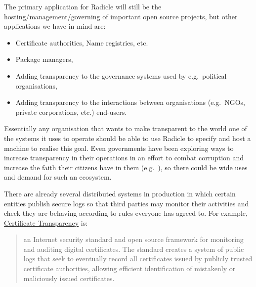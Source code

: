\documentclass[a4paper, oneside, 10pt]{amsart}
\begin{document}
The primary application for Radicle will still be the
hosting/management/governing of important open source projects, but other
applications we have in mind are:
\begin{itemize}
\item
  Certificate authorities, Name registries, etc.
\item
  Package managers,
\item
  Adding transparency to the governance systems used by e.g.~political
  organisations,
\item
  Adding transparency to the interactions between organisations
  (e.g.~NGOs, private corporations, etc.) end-users.
\end{itemize}

Essentially any organisation that wants to make transparent to the world one of
the systems it uses to operate should be able to use Radicle to specify and host
a machine to realise this goal. Even governments have been exploring ways to
increase transparency in their operations in an effort to combat corruption and
increase the faith their citizens have in them
(e.g.~\cite{ukraine-transparency}), so there could be wide uses and demand for
such an ecosystem.

There are already several distributed systems in production in which certain
entities publish secure logs so that third parties may monitor their activities
and check they are behaving according to rules everyone has agreed to. For
example,
\href{https://en.wikipedia.org/wiki/Certificate_Transparency}{Certificate
  Transparency} is:
\begin{quote}
an Internet security standard and open source framework for monitoring and
auditing digital certificates. The standard creates a system of public logs that
seek to eventually record all certificates issued by publicly trusted
certificate authorities, allowing efficient identification of mistakenly or
maliciously issued certificates.
\end{quote}
\end{document}
